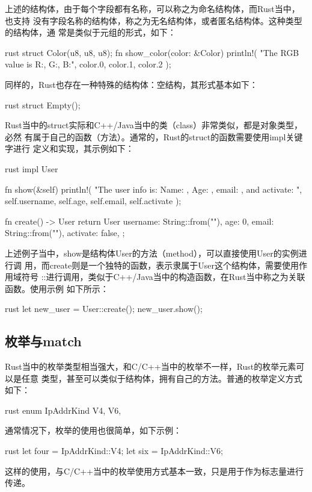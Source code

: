 上述的结构体，由于每个字段都有名称，可以称之为命名结构体，而Rust当中，也支持
没有字段名称的结构体，称之为无名结构体，或者匿名结构体。这种类型的结构体，通
常是类似于元组的形式，如下：
\begin{code-block}{rust}
struct Color(u8, u8, u8);
fn show_color(color: &Color) {
    println!(
        "The RGB value is R:{}, G:{}, B:{}",
        color.0, color.1, color.2
    );
}
\end{code-block}
同样的，Rust也存在一种特殊的结构体：空结构，其形式基本如下：
\begin{code-block}{rust}
struct Empty();
\end{code-block}

Rust当中的struct实际和C++/Java当中的类（class）非常类似，都是对象类型，必然
有属于自己的函数（方法）。通常的，Rust的struct的函数需要使用impl关键字进行
定义和实现，其示例如下：
\begin{code-block}{rust}
impl User {
    fn show(&self) {
        println!(
            "The user info is: Name: {}, Age: {}, email: {}, and activate: {}",
            self.username, self.age, self.email, self.activate
        );
    }

    fn create() -> User {
        return User {
            username: String::from(""),
            age: 0,
            email: String::from(""),
            activate: false,
        };
    }
}
\end{code-block}
上述例子当中，show是结构体User的方法（method），可以直接使用User的实例进行调
用，而create则是一个独特的函数，表示隶属于User这个结构体，需要使用作用域符号
::进行调用，类似于C++/Java当中的构造函数，在Rust当中称之为关联函数。使用示例
如下所示：
\begin{code-block}{rust}
let new_user = User::create();
new_user.show();
\end{code-block}

\subsection{枚举与match}
Rust当中的枚举类型相当强大，和C/C++当中的枚举不一样，Rust的枚举元素可以是任意
类型，甚至可以类似于结构体，拥有自己的方法。普通的枚举定义方式如下：
\begin{code-block}{rust}
enum IpAddrKind {
    V4,
    V6,
}
\end{code-block}
通常情况下，枚举的使用也很简单，如下示例：
\begin{code-block}{rust}
let four = IpAddrKind::V4;
let six = IpAddrKind::V6;
\end{code-block}
这样的使用，与C/C++当中的枚举使用方式基本一致，只是用于作为标志量进行传递。

